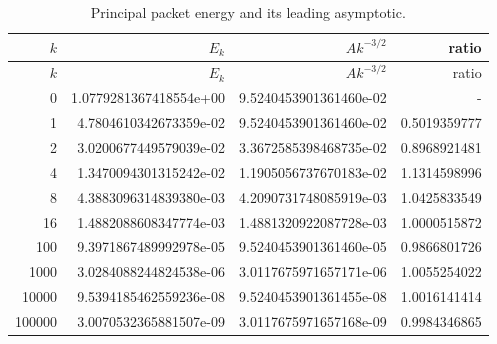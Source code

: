 \begin{longtable}{rrrr}
\caption{Principal packet energy and its leading asymptotic.}\label{tab:energy}\\
\toprule
$k$ & $E_k$ & $A k^{-3/2}$ & ratio\\
\midrule
\endfirsthead
\toprule
$k$ & $E_k$ & $A k^{-3/2}$ & ratio\\
\midrule
\endhead
0 & 1.0779281367418554e+00 & 9.5240453901361460e-02 & - \\
1 & 4.7804610342673359e-02 & 9.5240453901361460e-02 & 0.5019359777 \\
2 & 3.0200677449579039e-02 & 3.3672585398468735e-02 & 0.8968921481 \\
4 & 1.3470094301315242e-02 & 1.1905056737670183e-02 & 1.1314598996 \\
8 & 4.3883096314839380e-03 & 4.2090731748085919e-03 & 1.0425833549 \\
16 & 1.4882088608347774e-03 & 1.4881320922087728e-03 & 1.0000515872 \\
100 & 9.3971867489992978e-05 & 9.5240453901361460e-05 & 0.9866801726 \\
1000 & 3.0284088244824538e-06 & 3.0117675971657171e-06 & 1.0055254022 \\
10000 & 9.5394185462559236e-08 & 9.5240453901361455e-08 & 1.0016141414 \\
100000 & 3.0070532365881507e-09 & 3.0117675971657168e-09 & 0.9984346865 \\
\bottomrule
\end{longtable}
